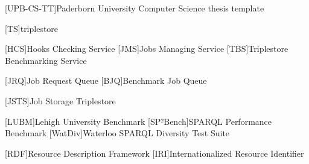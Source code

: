 \theoremstyle{plain}
\newtheorem{definition}{Definition}[chapter]
\newtheorem{lemma}[definition]{Lemma}
\ifgerman
	\newtheorem{theorem}[definition]{Satz}
	\newtheorem{corollary}[definition]{Korollar}
	\newtheorem{example}[definition]{Beispiel}
\else
	\newtheorem{theorem}[definition]{Theorem}
	\newtheorem{corollary}[definition]{Corollary}
	\newtheorem{example}[definition]{Example}
\fi



\newcommand*{\eg}{e.\,g.}
\newcommand*{\ie}{i.\,e.}
\newcommand*{\cf}{c.\,f.}
\newcommand*{\etal}{et~al.}

[UPB-CS-TT]{Paderborn University Computer Science thesis template}

\DeclareMathOperator{\testop}{top}

[TS]{triplestore}

\newcommand*{\ts}{\acl*{ts}}
\newcommand*{\tsp}{\aclp*{ts}}

\newcommand*{\iguana}{\textsc{Iguana}}
\newcommand*{\tentris}{\textsc{Tentris}}


\newcommand*{\gh}{GitHub}
\newcommand*{\dockh}{Docker Hub}

[HCS]{Hooks Checking Service}
[JMS]{Jobs Managing Service}
[TBS]{Triplestore Benchmarking Service}

[JRQ]{Job Request Queue}
[BJQ]{Benchmark Job Queue}

[JSTS]{Job Storage Triplestore}

[LUBM]{Lehigh University Benchmark}
[SP²Bench]{SPARQL Performance Benchmark}
[WatDiv]{Waterloo SPARQL Diversity Test Suite}

[RDF]{Resource Description Framework}
[IRI]{Internationalized Resource Identifier}


\lstset{
	basicstyle=\scriptsize\ttfamily,
	numbers=left
}